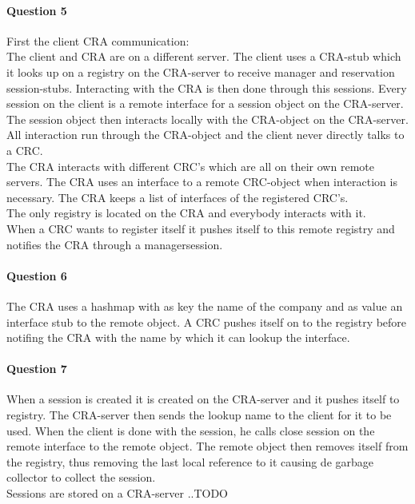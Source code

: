 \documentclass{ds-report}
\begin{document}
	\paragraph{Question 5} 
	First the client CRA communication:\\

	The client and CRA are on a different server. The client uses a CRA-stub which it looks up on a registry on the CRA-server to receive manager and reservation session-stubs. Interacting with the CRA is then done through this sessions. Every session on the client is a remote interface for a session object on the CRA-server. The session object then interacts locally with the CRA-object on the CRA-server. \\
	All interaction run through the CRA-object and the client never directly talks to a CRC. \\
	The CRA interacts with different CRC's which are all on their own remote servers. The CRA uses an interface to a remote CRC-object when interaction is necessary. The CRA keeps a list of interfaces of the registered CRC's. \\
	The only registry is located on the CRA and everybody interacts with it.\\
	When a CRC wants to register itself it pushes itself to this remote registry and notifies the CRA through a managersession. 
	
	\paragraph{Question 6} 
	The CRA uses a hashmap with as key the name of the company and as value an interface stub to the remote object. A CRC pushes itself on to the registry before notifing the CRA with the name by which it can lookup the interface.
	
	\paragraph{Question 7} 
	When a session is created it is created on the CRA-server and it pushes itself to registry. The CRA-server then sends the lookup name to the client for it to be used. When the client is done with the session, he calls close session on the remote interface to the remote object. The remote object then removes itself from the registry, thus removing the last local reference to it causing de garbage collector to collect the session. \\
	Sessions are stored on a CRA-server ..TODO\\
	
\end{document}
